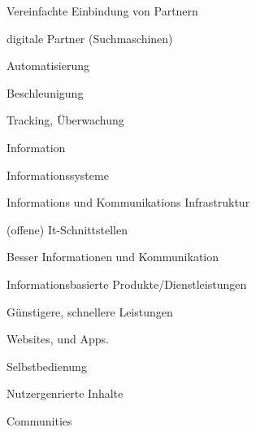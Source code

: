 \begin{description}

    \item[Schlüsselpartner]

    \item Vereinfachte Einbindung von Partnern

    \item digitale Partner (Suchmaschinen)

    \item[Schlüsselaktivitäten]

    \item Automatisierung

    \item Beschleunigung

    \item Tracking, Überwachung

    \item[Schlüsselressorucen]

    \item Information

    \item Informationssysteme

    \item Informations und Kommunikations Infrastruktur

    \item (offene) It-Schnittstellen

    \item[Wertversprechen]

    \item Besser Informationen und Kommunikation

    \item Informationsbasierte Produkte/Dienstleistungen

    \item Günstigere, schnellere Leistungen

    \item[Kundenbeziehung]

    \item Websites, und Apps.

    \item Selbstbedienung

    \item Nutzergenrierte Inhalte

    \item Communities

    \item[Kanäle]


\end{description}
